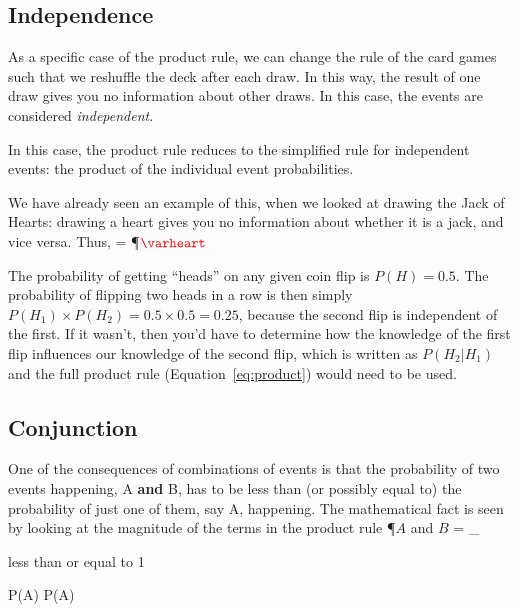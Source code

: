 \subsection{Independence}\label{sec:independence}

As a specific case of the product rule, we can change the rule of the card games such that we reshuffle the deck after each draw.  In this way, the result of one draw gives you no information about other draws.  In this case, the events are considered {\em independent}. 


In this  case, the product rule reduces to the simplified rule for independent events: the product of the individual event probabilities.


We have already seen an example of this, when we looked at drawing the Jack of Hearts: drawing a heart gives you no information about whether it is a jack, and vice versa.  Thus,
\beqn
{} = \P{$\hearts$}
\eeqn


The probability of getting ``heads'' on any given coin flip is $P(H)=0.5$.  The probability of flipping two heads in a row is then simply $P(H_{1}) \times P(H_{2})=0.5\times 0.5 = 0.25$, because the second flip is independent of the first.  If it wasn't, then you'd have to determine how the knowledge of the first flip influences our knowledge of the second flip, which is written as $P(H_{2}|H_{1})$ and the full product rule (Equation~\ref{eq:product}) would need to be used.

\subsection{Conjunction}\label{sec:conjunction}

One of the consequences of combinations of events is that the probability of two events happening, A {\bf and} B, has to be less than (or possibly equal to) the probability of just one of them, say A, happening.  The mathematical fact is seen by looking at the magnitude of the terms in the product rule
\beqn
\P{$A$ and $B$} = _{\parbox{.5in}{less than or equal to 1}}\times P(A) \leq P(A)
\eeqn

